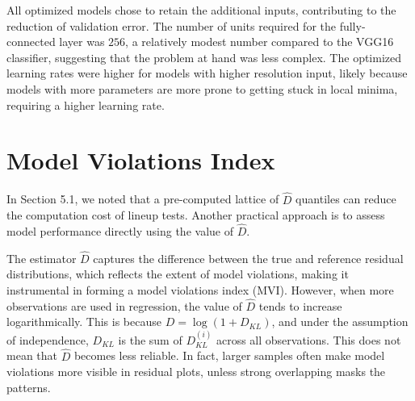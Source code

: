 \documentclass[]{interact}
\theoremstyle{plain}%
\theoremstyle{definition}
\theoremstyle{remark}
\begin{document}
All optimized models chose to retain the additional inputs, contributing
to the reduction of validation error. The number of units required for
the fully-connected layer was \(256\), a relatively modest number
compared to the VGG16 classifier, suggesting that the problem at hand
was less complex. The optimized learning rates were higher for models
with higher resolution input, likely because models with more parameters
are more prone to getting stuck in local minima, requiring a higher
learning rate.

\begin{table}
\centering
\caption{\label{tab:best-hyperparameter}Hyperparameters values for the optimized computer vision models with different input sizes.}
\centering
{}
\end{table}

\section{Model Violations Index}\label{sec-model-violations-index}

In Section 5.1, we noted that a pre-computed lattice of \(\hat{D}\)
quantiles can reduce the computation cost of lineup tests. Another
practical approach is to assess model performance directly using the
value of \(\hat{D}\).

The estimator \(\hat{D}\) captures the difference between the true and
reference residual distributions, which reflects the extent of model
violations, making it instrumental in forming a model violations index
(MVI). However, when more observations are used in regression, the value
of \(\hat{D}\) tends to increase logarithmically. This is because
\(D = \log(1 + D_{KL})\), and under the assumption of independence,
\(D_{KL}\) is the sum of \(D_{KL}^{(i)}\) across all observations. This
does not mean that \(\hat{D}\) becomes less reliable. In fact, larger
samples often make model violations more visible in residual plots,
unless strong overlapping masks the patterns.
\end{document}
